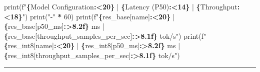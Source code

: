 \documentclass[
  letterpaper,
]{scrbook}
\newenvironment{Shaded}{\begin{snugshade}}{\end{snugshade}}
\newcommand{\BuiltInTok}[1]{#1}
\newcommand{\DecValTok}[1]{\textcolor[rgb]{0.00,0.00,0.81}{#1}}
\newcommand{\NormalTok}[1]{#1}
\newcommand{\OperatorTok}[1]{\textcolor[rgb]{0.81,0.36,0.00}{\textbf{#1}}}
\newcommand{\SpecialCharTok}[1]{\textcolor[rgb]{0.81,0.36,0.00}{\textbf{#1}}}
\newcommand{\SpecialStringTok}[1]{\textcolor[rgb]{0.31,0.60,0.02}{#1}}
\newcommand{\StringTok}[1]{\textcolor[rgb]{0.31,0.60,0.02}{#1}}
\begin{document}
\begin{Shaded}
\begin{Highlighting}[]
\BuiltInTok{print}\NormalTok{(}\SpecialStringTok{f"}\SpecialCharTok{\{}\StringTok{\textquotesingle{}Model Configuration\textquotesingle{}}\SpecialCharTok{:\textless{}20\}}\SpecialStringTok{ | }\SpecialCharTok{\{}\StringTok{\textquotesingle{}Latency (P50)\textquotesingle{}}\SpecialCharTok{:\textless{}14\}}\SpecialStringTok{ | }\SpecialCharTok{\{}\StringTok{\textquotesingle{}Throughput\textquotesingle{}}\SpecialCharTok{:\textless{}18\}}\SpecialStringTok{"}\NormalTok{)}
\BuiltInTok{print}\NormalTok{(}\StringTok{"{-}"} \OperatorTok{*} \DecValTok{60}\NormalTok{)}
\BuiltInTok{print}\NormalTok{(}\SpecialStringTok{f"}\SpecialCharTok{\{}\NormalTok{res\_base[}\StringTok{\textquotesingle{}name\textquotesingle{}}\NormalTok{]}\SpecialCharTok{:\textless{}20\}}\SpecialStringTok{ | }\SpecialCharTok{\{}\NormalTok{res\_base[}\StringTok{\textquotesingle{}p50\_ms\textquotesingle{}}\NormalTok{]}\SpecialCharTok{:\textgreater{}8.2f\}}\SpecialStringTok{ ms     | }\SpecialCharTok{\{}\NormalTok{res\_base[}\StringTok{\textquotesingle{}throughput\_samples\_per\_sec\textquotesingle{}}\NormalTok{]}\SpecialCharTok{:\textgreater{}8.1f\}}\SpecialStringTok{ tok/s"}\NormalTok{)}
\BuiltInTok{print}\NormalTok{(}\SpecialStringTok{f"}\SpecialCharTok{\{}\NormalTok{res\_int8[}\StringTok{\textquotesingle{}name\textquotesingle{}}\NormalTok{]}\SpecialCharTok{:\textless{}20\}}\SpecialStringTok{ | }\SpecialCharTok{\{}\NormalTok{res\_int8[}\StringTok{\textquotesingle{}p50\_ms\textquotesingle{}}\NormalTok{]}\SpecialCharTok{:\textgreater{}8.2f\}}\SpecialStringTok{ ms     | }\SpecialCharTok{\{}\NormalTok{res\_int8[}\StringTok{\textquotesingle{}throughput\_samples\_per\_sec\textquotesingle{}}\NormalTok{]}\SpecialCharTok{:\textgreater{}8.1f\}}\SpecialStringTok{ tok/s"}\NormalTok{)}
\end{Highlighting}
\end{Shaded}

\begin{center}\rule{0.5\linewidth}{0.5pt}\end{center}
\end{document}
